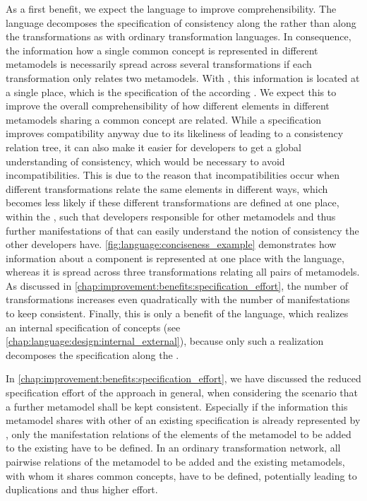 As a first benefit, we expect the \commonalities language to improve comprehensibility.
The language decomposes the specification of consistency along the \commonalities rather than along the transformations as with ordinary transformation languages.
In consequence, the information how a single common concept is represented in different metamodels is necessarily spread across several transformations if each transformation only relates two metamodels.
With \commonalities, this information is located at a single place, which is the specification of the according \commonality.
We expect this to improve the overall comprehensibility of how different elements in different metamodels sharing a common concept are related.
While a \commonalities specification improves compatibility anyway due to its likeliness of leading to a consistency relation tree, it can also make it easier for developers to get a global understanding of consistency, which would be necessary to avoid incompatibilities.
This is due to the reason that incompatibilities occur when different transformations relate the same elements in different ways, which becomes less likely if these different transformations are defined at one place, within the \commonality, such that developers responsible for other metamodels and thus further manifestations of that \commonality can easily understand the notion of consistency the other developers have.
\autoref{fig:language:conciseness_example} demonstrates how information about a component \commonality is represented at one place with the \commonalities language, whereas it is spread across three \qvtr transformations relating all pairs of metamodels.
As discussed in \autoref{chap:improvement:benefits:specification_effort}, the number of transformations increases even quadratically with the number of manifestations to keep consistent.
Finally, this is only a benefit of the \commonalities language, which realizes an internal specification of concepts (see \autoref{chap:language:design:internal_external}), because only such a realization decomposes the specification along the \commonalities.

In \autoref{chap:improvement:benefits:specification_effort}, we have discussed the reduced specification effort of the \commonalities approach in general, when considering the scenario that a further metamodel shall be kept consistent.
Especially if the information this metamodel shares with other \concretemetamodels of an existing \commonalities specification is already represented by \commonalities, only the manifestation relations of the elements of the metamodel to be added to the existing \commonalities have to be defined.
In an ordinary transformation network, all pairwise relations of the metamodel to be added and the existing metamodels, with whom it shares common concepts, have to be defined, potentially leading to duplications and thus higher effort.

